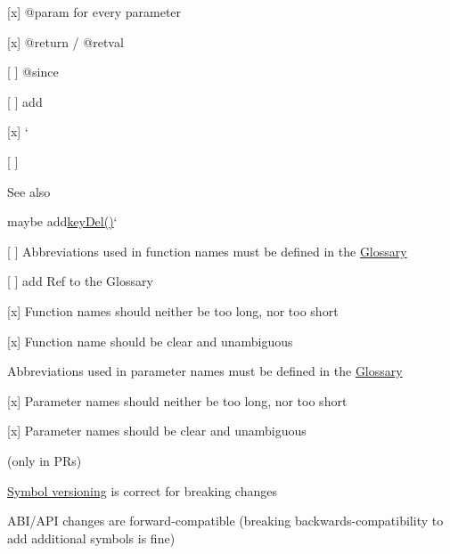 \begin{DoxyItemize}
\begin{DoxyItemize}
\end{DoxyItemize}
\item \mbox{[}x\mbox{]} {\ttfamily @param} for every parameter
\item \mbox{[}x\mbox{]} {\ttfamily @return} / {\ttfamily @retval}
\item \mbox{[} \mbox{]} {\ttfamily @since}
\begin{DoxyItemize}
\item \mbox{[} \mbox{]} add
\end{DoxyItemize}
\item \mbox{[}x\mbox{]} `{\ttfamily }
\item {\ttfamily \mbox{[} \mbox{]}}\begin{DoxySeeAlso}{See also}
{\ttfamily 
\begin{DoxyItemize}
\item maybe add\hyperlink{group__key_ga3df95bbc2494e3e6703ece5639be5bb1}{key\+Del()}`
\end{DoxyItemize}}
\end{DoxySeeAlso}

\end{DoxyItemize}

{\ttfamily 
\begin{DoxyItemize}
\item \mbox{[} \mbox{]} Abbreviations used in function names must be defined in the \hyperlink{doc_help_elektra-glossary_md}{Glossary}
\begin{DoxyItemize}
\item \mbox{[} \mbox{]} add Ref to the Glossary
\end{DoxyItemize}
\item \mbox{[}x\mbox{]} Function names should neither be too long, nor too short
\item \mbox{[}x\mbox{]} Function name should be clear and unambiguous
\item Abbreviations used in parameter names must be defined in the \hyperlink{doc_help_elektra-glossary_md}{Glossary}
\item \mbox{[}x\mbox{]} Parameter names should neither be too long, nor too short
\item \mbox{[}x\mbox{]} Parameter names should be clear and unambiguous
\end{DoxyItemize}}

{\ttfamily }

{\ttfamily  (only in P\+Rs)}

{\ttfamily 
\begin{DoxyItemize}
\item \hyperlink{doc_dev_symbol-versioning_md}{Symbol versioning} is correct for breaking changes
\item A\+B\+I/\+A\+PI changes are forward-\/compatible (breaking backwards-\/compatibility to add additional symbols is fine)
\end{DoxyItemize}}

